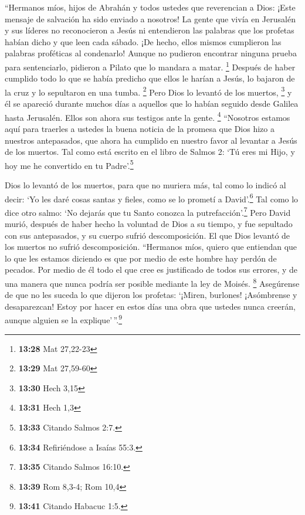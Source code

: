  ``Hermanos míos, hijos de Abrahán y todos ustedes que
reverencian a Dios: ¡Este mensaje de salvación ha sido enviado a
nosotros!  La gente que vivía en Jerusalén y sus líderes
no reconocieron a Jesús ni entendieron las palabras que los profetas
habían dicho y que leen cada sábado. ¡De hecho, ellos mismos cumplieron
las palabras proféticas al condenarlo!  Aunque no
pudieron encontrar ninguna prueba para sentenciarlo, pidieron a Pilato
que lo mandara a matar. \footnote{\textbf{13:28} Mat 27,22-23}
 Después de haber cumplido todo lo que se había predicho
que ellos le harían a Jesús, lo bajaron de la cruz y lo sepultaron en
una tumba. \footnote{\textbf{13:29} Mat 27,59-60}  Pero
Dios lo levantó de los muertos, \footnote{\textbf{13:30} Hech 3,15}
 y él se apareció durante muchos días a aquellos que lo
habían seguido desde Galilea hasta Jerusalén. Ellos son ahora sus
testigos ante la gente. \footnote{\textbf{13:31} Hech 1,3}
 ``Nosotros estamos aquí para traerles a ustedes la buena
noticia de la promesa que Dios hizo a nuestros antepasados,
 que ahora ha cumplido en nuestro favor al levantar a
Jesús de los muertos. Tal como está escrito en el libro de Salmos 2: `Tú
eres mi Hijo, y hoy me he convertido en tu Padre'.\footnote{\textbf{13:33}
  Citando Salmos 2:7.}

 Dios lo levantó de los muertos, para que no muriera más,
tal como lo indicó al decir: `Yo les daré cosas santas y fieles, como se
lo prometí a David'.\footnote{\textbf{13:34} Refiriéndose a Isaías 55:3.}
 Tal como lo dice otro salmo: `No dejarás que tu Santo
conozca la putrefacción'.\footnote{\textbf{13:35} Citando Salmos 16:10.}
 Pero David murió, después de haber hecho la voluntad de
Dios a su tiempo, y fue sepultado con sus antepasados, y su cuerpo
sufrió descomposición.  El que Dios levantó de los
muertos no sufrió descomposición.  ``Hermanos míos,
quiero que entiendan que lo que les estamos diciendo es que por medio de
este hombre hay perdón de pecados.  Por medio de él todo
el que cree es justificado de todos sus errores, y de una manera que
nunca podría ser posible mediante la ley de Moisés. \footnote{\textbf{13:39}
  Rom 8,3-4; Rom 10,4}  Asegúrense de que no les suceda
lo que dijeron los profetas:  `¡Miren, burlones!
¡Asómbrense y desaparezcan! Estoy por hacer en estos días una obra que
ustedes nunca creerán, aunque alguien se la explique'\,''.\footnote{\textbf{13:41}
  Citando Habacuc 1:5.}

